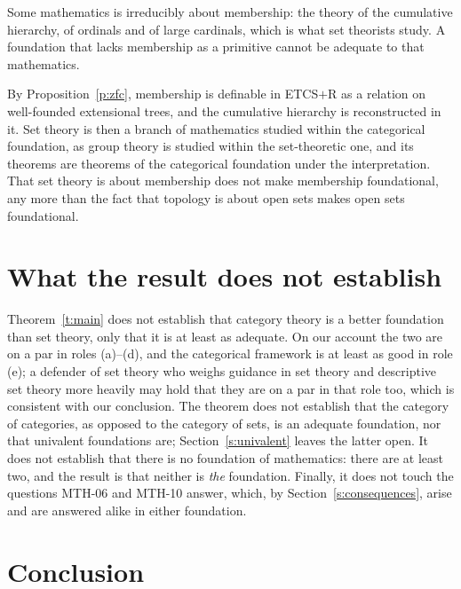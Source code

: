 \documentclass{situationist-preprint}
\begin{document}
\begin{objection}
Some mathematics is irreducibly about membership: the theory of the cumulative hierarchy, of ordinals and of large cardinals, which is what set theorists study. A foundation that lacks membership as a primitive cannot be adequate to that mathematics.
\end{objection}

\begin{reply}
By Proposition~\ref{p:zfc}, membership is definable in ETCS$+$R as a relation on well-founded extensional trees, and the cumulative hierarchy is reconstructed in it. Set theory is then a branch of mathematics studied within the categorical foundation, as group theory is studied within the set-theoretic one, and its theorems are theorems of the categorical foundation under the interpretation. That set theory is about membership does not make membership foundational, any more than the fact that topology is about open sets makes open sets foundational.
\end{reply}

\section{What the result does not establish}\label{s:limits}

Theorem~\ref{t:main} does not establish that category theory is a better foundation than set theory, only that it is at least as adequate. On our account the two are on a par in roles (a)--(d), and the categorical framework is at least as good in role (e); a defender of set theory who weighs guidance in set theory and descriptive set theory more heavily may hold that they are on a par in that role too, which is consistent with our conclusion. The theorem does not establish that the category of categories, as opposed to the category of sets, is an adequate foundation, nor that univalent foundations are; Section~\ref{s:univalent} leaves the latter open. It does not establish that there is no foundation of mathematics: there are at least two, and the result is that neither is \emph{the} foundation. Finally, it does not touch the questions MTH-06 and MTH-10 answer, which, by Section~\ref{s:consequences}, arise and are answered alike in either foundation.

\section{Conclusion}
\end{document}

